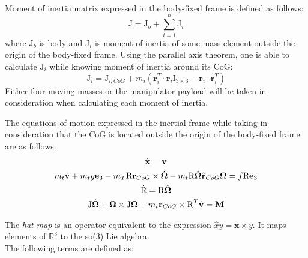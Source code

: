 Moment of inertia matrix expressed in the body-fixed frame is defined as follows:
\begin{equation}
\text{J} = \text{J}_b + \sum_{i=1}^{n}\text{J}_i
\end{equation}
where $\text{J}_b$ is body and $\text{J}_i$ is moment of inertia of some mass element outside the origin of the body-fixed frame. Using the parallel axis theorem, one is able to calculate $\text{J}_i$ while knowing moment of inertia around its CoG:
\begin{equation}
\text{J}_i = \text{J}_{i,CoG} + m_i( \textbf{r}_i^T \cdot  \textbf{r}_i \text{I}_{3 \times 3} -  \textbf{r}_i \cdot  \textbf{r}_i^T)
\end{equation}
Either four moving masses or the manipulator payload will be taken in consideration when calculating each moment of inertia.

The equations of motion expressed in the inertial frame while taking in consideration that the CoG is located outside the origin of the body-fixed frame are as follows\cite{LeeModel}: 
\begin{gather}
	\dot{\textbf{x}} = \textbf{v} \label{model1}\\
	m_t\dot{\textbf{v}} + m_tg\textbf{e}_3 - m_T\text{R}  \textbf{r}_{CoG} \times \dot{\boldsymbol{\Omega}} - m_t\text{R}\hat{\boldsymbol{\Omega}}\hat{ \textbf{r}}_{CoG}\boldsymbol{\Omega} = f\text{R}\textbf{e}_3 \label{model2} \\
	\dot{\text{R}} = \text{R}\hat{\boldsymbol{\Omega}} \label{model3} \\
	\text{J} \dot{\boldsymbol{\Omega}} + \boldsymbol{\Omega} \times \text{J} \boldsymbol{\Omega} + m_t  \textbf{r}_{CoG} \times \text{R}^T \dot{\textbf{v}} = \textbf{M} \label{model4}
\end{gather}

\noindent The \textit{hat map} is an operator equivalent to the expression $\hat{x}y = \textbf{x} \times y$. It maps elements of $\mathbb{R}^3$ to the so(3) Lie algebra. \\

\noindent The following terms are defined as:

